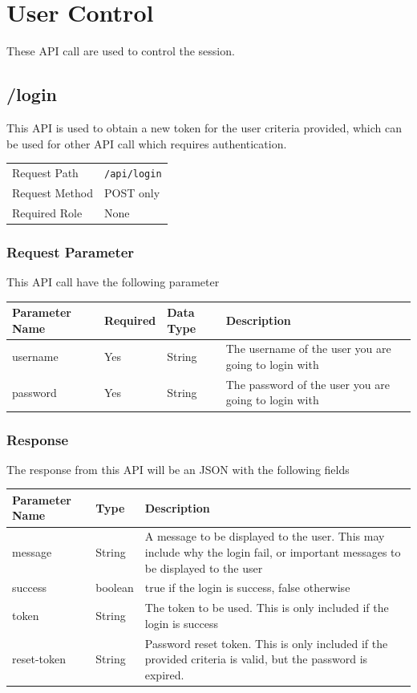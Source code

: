 \documentclass[12pt]{report}
\begin{document}
    \chapter{User Control}\label{ch:user_control}
    These API call are used to control the session.
    \section{/login}\label{api:login}
    This API is used to obtain a new token for the user criteria provided, which can be used for other API call which
    requires authentication.

    \begin{longtable}{p{5cm}p{10cm}}
        Request Path   & \texttt{/api/login} \\
        Request Method & POST only \\
        Required Role  & None
    \end{longtable}

    \subsection{Request Parameter}
    This API call have the following parameter

    \begin{longtable}{|l|l|l||p{7cm}|}
        \hline
        Parameter Name & Required & Data Type & Description \\\hline\endhead
        username & Yes & String & The username of the user you are going to login with \\\hline
        password & Yes & String & The password of the user you are going to login with \\\hline
    \end{longtable}

    \subsection{Response}
    The response from this API will be an JSON with the following fields
    \begin{longtable}{|p{}|p{}||p{}|}\hline
        Parameter Name & Type & Description \\\hline\endhead
        message & String & A message to be displayed to the user.
        This may include why the login fail, or important messages to be displayed to the user \\\hline
        success & boolean & true if the login is success, false otherwise \\\hline
        token & String & The token to be used.
        This is only included if the login is success \\\hline
        reset-token & String & Password reset token.
        This is only included if the provided criteria is valid, but the password is expired. \\\hline
    \end{longtable}
\end{document}
